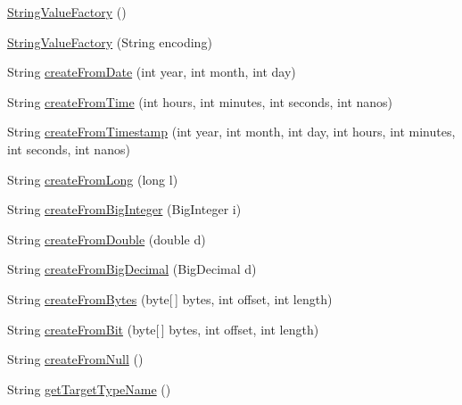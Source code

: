 \begin{DoxyCompactItemize}
\item 
\mbox{\hyperlink{classcom_1_1mysql_1_1cj_1_1result_1_1_string_value_factory_ab805886b942c3f13d48b270b2703c6a3}{String\+Value\+Factory}} ()
\item 
\mbox{\hyperlink{classcom_1_1mysql_1_1cj_1_1result_1_1_string_value_factory_a5bd9a9fbad0e523e9bf4081143d89e62}{String\+Value\+Factory}} (String encoding)
\item 
String \mbox{\hyperlink{classcom_1_1mysql_1_1cj_1_1result_1_1_string_value_factory_a845e3704aa7f1a243b1fca5975dff12a}{create\+From\+Date}} (int year, int month, int day)
\item 
String \mbox{\hyperlink{classcom_1_1mysql_1_1cj_1_1result_1_1_string_value_factory_a403e61bfaa13268e2eb0a15ff92e0aea}{create\+From\+Time}} (int hours, int minutes, int seconds, int nanos)
\item 
String \mbox{\hyperlink{classcom_1_1mysql_1_1cj_1_1result_1_1_string_value_factory_aff6a7f18d539842dd935facd7df39008}{create\+From\+Timestamp}} (int year, int month, int day, int hours, int minutes, int seconds, int nanos)
\item 
String \mbox{\hyperlink{classcom_1_1mysql_1_1cj_1_1result_1_1_string_value_factory_a5042159a05354abc9635cb4c4ddbf4bc}{create\+From\+Long}} (long l)
\item 
String \mbox{\hyperlink{classcom_1_1mysql_1_1cj_1_1result_1_1_string_value_factory_a5f8b67f6802da33bca7e2d1e91ad8fb0}{create\+From\+Big\+Integer}} (Big\+Integer i)
\item 
String \mbox{\hyperlink{classcom_1_1mysql_1_1cj_1_1result_1_1_string_value_factory_a6f7c243f160705b6521c7db2e27c77dd}{create\+From\+Double}} (double d)
\item 
String \mbox{\hyperlink{classcom_1_1mysql_1_1cj_1_1result_1_1_string_value_factory_aeb5994f74d36ed8904895e7057910c69}{create\+From\+Big\+Decimal}} (Big\+Decimal d)
\item 
String \mbox{\hyperlink{classcom_1_1mysql_1_1cj_1_1result_1_1_string_value_factory_a72878f32e5fe17e1266d38c9145768b6}{create\+From\+Bytes}} (byte\mbox{[}$\,$\mbox{]} bytes, int offset, int length)
\item 
String \mbox{\hyperlink{classcom_1_1mysql_1_1cj_1_1result_1_1_string_value_factory_affa7f241f076824269476e711d4c1106}{create\+From\+Bit}} (byte\mbox{[}$\,$\mbox{]} bytes, int offset, int length)
\item 
String \mbox{\hyperlink{classcom_1_1mysql_1_1cj_1_1result_1_1_string_value_factory_a8c7fe6d32a4f827298803b7774064bdc}{create\+From\+Null}} ()
\item 
String \mbox{\hyperlink{classcom_1_1mysql_1_1cj_1_1result_1_1_string_value_factory_ae9d043abc23f82f37cc3552f02469ea8}{get\+Target\+Type\+Name}} ()
\end{DoxyCompactItemize}


